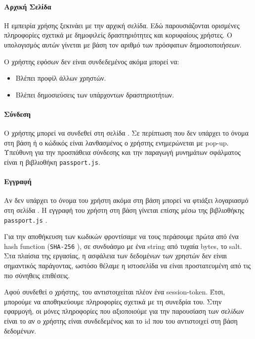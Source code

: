 \documentclass[acmtog, nonacm, language=english, language=greek]{acmart}
\newcommand{\en}[1]{\textlatin{#1}}
\newcommand{\src}[1]{\texttt{\en{#1}}}
\begin{document}
\paragraph{Αρχική Σελίδα}

Η εμπειρία χρήσης ξεκινάει με την αρχική σελίδα. 
Εδώ παρουσιάζονται ορισμένες πληροφορίες σχετικά με
δημοφιλείς δραστηριότητες και κορυφαίους χρήστες. 
Ο υπολογισμός αυτών γίνεται με βάση τον αριθμό των πρόσφατων δημοσιοποιήσεων.

Ο χρήστης εφόσων δεν είναι συνδεδεμένος ακόμα μπορεί να: 

\begin{itemize}
    \item Βλέπει προφίλ άλλων χρηστών.
    \item Βλέπει δημοσιεύσεις των υπάρχοντων δραστηριοτήτων.
\end{itemize}

\paragraph{Σύνδεση}

Ο χρήστης μπορεί να συνδεθεί στη σελίδα \say{\en{Login}}. Σε περίπτωση που δεν
υπάρχει το όνομα στη βάση ή ο κώδικός είναι λανθασμένος ο χρήστης ενημερώνεται
με \en{pop-up}. Υπεύθυνη για την προσπάθεια σύνδεσης και την παραγωγή μυνημάτων
σφάλματος είναι η βιβλιοθήκη \src{passport.js}. 

\paragraph{Εγγραφή}

Αν δεν υπάρχει το όνομα του χρήστη ακόμα στη βάση μπορεί να φτιάξει λογαριασμό
στη σελίδα \say{\en{Register}}. Η εγγραφή του χρήστη στη βάση γίνεται επίσης
μέσω της βιβλιοθήκης \src{passport.js} \cite{Passport}.

Για την αποθήκευση των κωδικών φροντίσαμε να τους περάσουμε πρώτα από 
ένα \en{hash function} (\src{SHA-256} \cite{SHA256}), σε συνδυάσμο 
με ένα \en{string} από τυχαία \en{bytes}, το \en{salt}.
Στα πλαίσια της εργασίας, η ασφάλεια των δεδομένων των χρηστών δεν είναι 
σημαντικός παράγοντας, ωστόσο θέλαμε η ιστοσελίδα να είναι προστατευμένη 
από τις πιο σύνηθεις επιθέσεις.

Αφού συνδεθεί ο χρήστης, του αντιστοιχείται πλέον ένα \en{session-token}. Έτσι,
μπορούμε να αποθηκεύουμε πληροφορίες σχετικά με τη συνεδρία του. Στην εφαρμογή,
οι μόνες πληροφορίες που αξιοποιούμε για την παρουσίαση των σελίδων είναι το αν
ο χρήστης είναι συνδεδεμένος και το \en{id} που του αντιστοιχεί στη βάση
δεδομένων.
\end{document}
